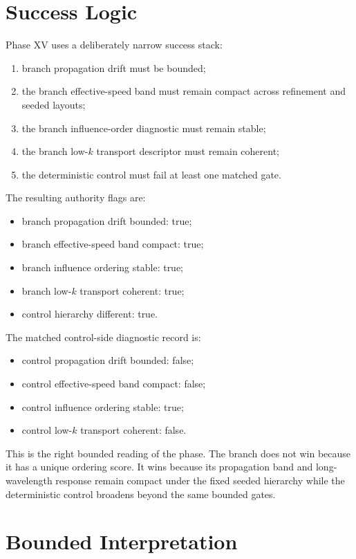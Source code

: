 \documentclass[11pt]{article}
\begin{document}
\section{Success Logic}

Phase XV uses a deliberately narrow success stack:
\begin{enumerate}
\item branch propagation drift must be bounded;
\item the branch effective-speed band must remain compact across refinement and seeded layouts;
\item the branch influence-order diagnostic must remain stable;
\item the branch low-$k$ transport descriptor must remain coherent;
\item the deterministic control must fail at least one matched gate.
\end{enumerate}

The resulting authority flags are:
\begin{itemize}
\item branch propagation drift bounded: true;
\item branch effective-speed band compact: true;
\item branch influence ordering stable: true;
\item branch low-$k$ transport coherent: true;
\item control hierarchy different: true.
\end{itemize}

The matched control-side diagnostic record is:
\begin{itemize}
\item control propagation drift bounded: false;
\item control effective-speed band compact: false;
\item control influence ordering stable: true;
\item control low-$k$ transport coherent: false.
\end{itemize}

This is the right bounded reading of the phase. The branch does not win because it has a unique ordering score. It wins because its propagation band and long-wavelength response remain compact under the fixed seeded hierarchy while the deterministic control broadens beyond the same bounded gates.

\section{Bounded Interpretation}
\end{document}
